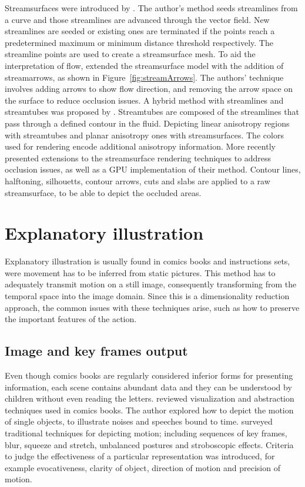 Streamsurfaces were introduced by \cite{Hultquist1992}.
The author's method seeds streamlines from a curve and those streamlines are advanced through the vector field.
New streamlines are seeded or existing ones are terminated if the points reach a predetermined maximum or minimum distance threshold respectively.
The streamline points are used to create a streamsurface mesh.
To aid the interpretation of flow, \cite{Loffelmann1997} extended the streamsurface model with the addition of streamarrows, as shown in Figure~\ref{fig:streamArrows}.
The authors' technique involves adding arrows to show flow direction, and removing the arrow space on the surface to reduce occlusion issues.
A hybrid method with streamlines and streamtubes was proposed by \cite{Zhang2003}.
Streamtubes are composed of the streamlines that pass through a defined contour in the fluid.
Depicting linear anisotropy regions with streamtubes and planar anisotropy ones with streamsurfaces.
The colors used for rendering encode additional anisotropy information.
More recently \cite{Born2010} presented extensions to the streamsurface rendering techniques to address occlusion issues, as well as a GPU implementation of their method.
Contour lines, halftoning, silhouetts, contour arrows, cuts and slabs are applied to a raw streamsurface, to be able to depict the occluded areas.


\section{Explanatory illustration}

Explanatory illustration is usually found in comics books and instructions sets, were movement has to be inferred from static pictures.
This method has to adequately transmit motion on a still image, consequently transforming from the temporal space into the image domain.
Since this is a dimensionality reduction approach, the common issues with these techniques arise, such as how to preserve the important features of the action.

\subsection{Image and key frames output}

Even though comics books are regularly considered inferior forms for presenting information, each scene contains abundant data and they can be understood by children without even reading the letters.
\cite{McCloud1993} reviewed visualization and abstraction techniques used in comics books.
The author explored how to depict the motion of single objects, to illustrate noises and speeches bound to time.
\cite{Cutting2002} surveyed traditional techniques for depicting motion; including sequences of key frames, blur, squeeze and stretch, unbalanced postures and stroboscopic effects.
Criteria to judge the effectiveness of a particular representation was introduced, for example evocativeness, clarity of object, direction of motion and precision of motion.

